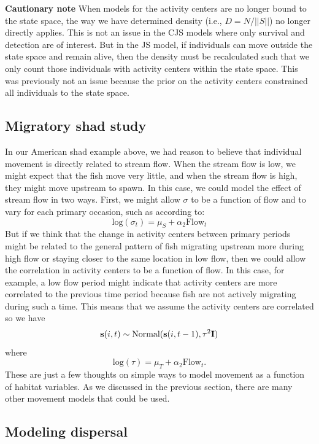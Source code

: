 {\bf Cautionary note}
When models for the activity centers are no longer bound to the state space,
the way we have determined density (i.e., $D = N/||S||$) no longer directly applies.
This is not an issue in the CJS models where only survival and detection are of interest.  But
in the JS model, if individuals can move outside the state space and remain alive, then
the density must be recalculated such that we only count those individuals with activity centers
within the state space.  This was previously not an issue because the prior on the activity 
centers constrained all individuals to the state space.  

\subsection{Migratory shad study}

In our American shad example above, we had reason to believe
that individual movement is directly related to stream flow.  When the
stream flow is low,
we might expect that the fish move very little, and when the stream
flow is high, they might
move upstream to spawn. In this case,
we could model the effect of stream flow in two ways.  First, we might allow $\sigma$
to be a function of flow and to vary for each primary occasion, such
as according to:
\[
 \mbox{log}(\sigma_t) = \mu_S + \alpha_2 \mbox{Flow}_t
\]
But if we think that the change in activity centers between primary periods might be related to the
general pattern of fish migrating upstream more during high flow or staying closer to the same location
in low flow, then we could allow the correlation in activity centers to be a function of flow.  In this
case, for example, a low flow period might indicate that activity centers are more correlated to the previous
time period because fish are not actively migrating during such a time.
This means that we assume the
activity centers are correlated so we have
\[
{\bf s}(i,t) \sim \mbox{Normal}({\bf
  s}(i,t-1), \tau^{2} {\bf I})
\]
where
\[
\mbox{log}(\tau) = \mu_T + \alpha_2 \mbox{Flow}_t.
\]
These are just a few thoughts on simple ways to model movement as a
function of habitat variables.
As we discussed in the previous section, there
are many other movement models that could be used.

\subsection{Modeling  dispersal}


